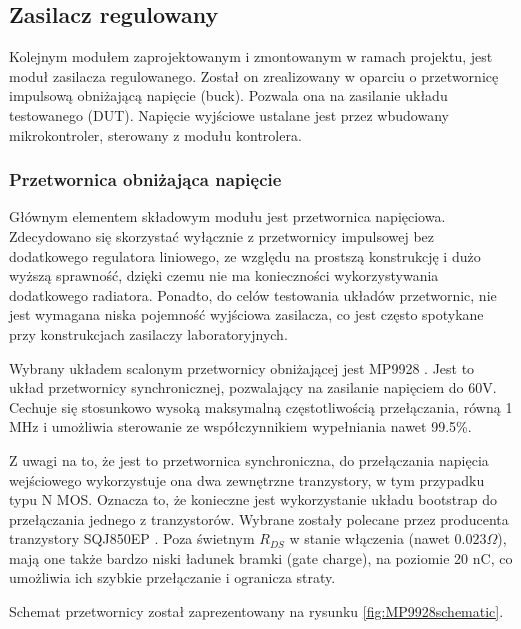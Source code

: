 \subsection{Zasilacz regulowany}
\label{section:zasilacz_regulowany}

Kolejnym modułem zaprojektowanym i zmontowanym w ramach projektu, jest moduł zasilacza regulowanego.
Został on zrealizowany w oparciu o przetwornicę impulsową obniżającą napięcie (buck). Pozwala ona na zasilanie 
układu testowanego (DUT). Napięcie wyjściowe ustalane jest przez wbudowany mikrokontroler, sterowany z modułu kontrolera.

\subsubsection{Przetwornica obniżająca napięcie}

Głównym elementem składowym modułu jest przetwornica napięciowa. Zdecydowano się skorzystać wyłącznie z przetwornicy impulsowej
bez dodatkowego regulatora liniowego, ze względu na prostszą konstrukcję i dużo wyższą sprawność, dzięki czemu nie ma konieczności wykorzystywania dodatkowego
radiatora. Ponadto, do celów testowania układów przetwornic, nie jest wymagana niska pojemność wyjściowa zasilacza, co jest 
często spotykane przy konstrukcjach zasilaczy laboratoryjnych. 

Wybrany układem scalonym przetwornicy obniżającej jest MP9928 \cite{MP9928}. Jest to układ przetwornicy synchronicznej,
pozwalający na zasilanie napięciem do 60V. Cechuje się stosunkowo wysoką maksymalną częstotliwością przełączania, równą 1 MHz i umożliwia sterowanie 
ze współczynnikiem wypełniania nawet 99.5\%. 

Z uwagi na to, że jest to przetwornica synchroniczna, do przełączania napięcia wejściowego wykorzystuje ona dwa zewnętrzne 
tranzystory, w tym przypadku typu N MOS. Oznacza to, że konieczne jest wykorzystanie układu bootstrap do przełączania jednego z tranzystorów.
Wybrane zostały polecane przez producenta tranzystory SQJ850EP \cite{SQJ850EP}. Poza świetnym $R_{DS}$ w stanie włączenia (nawet $0.023 \Omega$),
mają one także bardzo niski ładunek bramki (gate charge), na poziomie 20 nC, co umożliwia ich szybkie przełączanie i ogranicza straty.

Schemat przetwornicy został zaprezentowany na rysunku \ref{fig:MP9928schematic}.

